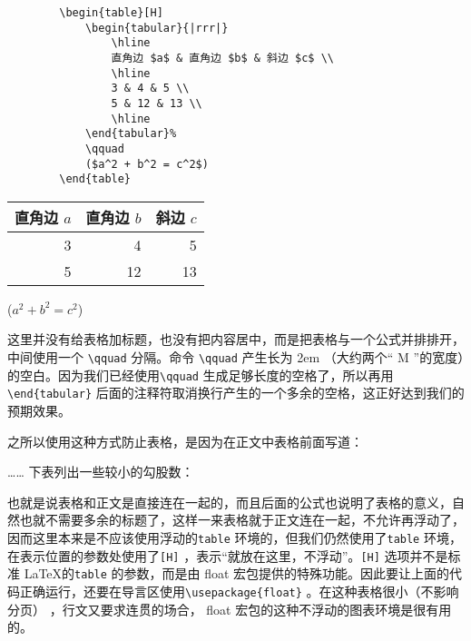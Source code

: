 \begin{minipage}[t]{0.45\textwidth}
    \begin{lstlisting}
        \begin{table}[H]
            \begin{tabular}{|rrr|}
                \hline
                直角边 $a$ & 直角边 $b$ & 斜边 $c$ \\ 
                \hline
                3 & 4 & 5 \\ 
                5 & 12 & 13 \\ 
                \hline
            \end{tabular}%
            \qquad
            ($a^2 + b^2 = c^2$)
        \end{table}
    \end{lstlisting}
\end{minipage}
\hfill
\begin{minipage}[t]{0.45\textwidth}
    \vspace{0.1cm}
    \hspace{0.5cm}
    \begin{table}[H]
        \begin{tabular}{|rrr|}
            \hline
            直角边 $a$ & 直角边 $b$ & 斜边 $c$ \\ 
            \hline
            3 & 4 & 5 \\ 
            5 & 12 & 13 \\ 
            \hline
        \end{tabular}%
        \qquad
        ($a^2 + b^2 = c^2$)
    \end{table}
\end{minipage}

这里并没有给表格加标题，也没有把内容居中，而是把表格与一个公式并排排开，中间使用一个 \verb|\qquad| 分隔。命令 \verb|\qquad| 产生长为 2em （大约两个“ M ”的宽度）的空白。因为我们已经使用\verb|\qquad| 生成足够长度的空格了，所以再用\verb|\end{tabular}| 后面的注释符取消换行产生的一个多余的空格，这正好达到我们的预期效果。

之所以使用这种方式防止表格，是因为在正文中表格前面写道：

{\qquad \heiti {} …… 下表列出一些较小的勾股数：}

也就是说表格和正文是直接连在一起的，而且后面的公式也说明了表格的意义，自然也就不需要多余的标题了，这样一来表格就于正文连在一起，不允许再浮动了，因而这里本来是不应该使用浮动的\verb|table| 环境的，但我们仍然使用了\verb|table| 环境，在表示位置的参数处使用了\verb|[H]| ，表示“就放在这里，不浮动”。\verb|[H]| 选项并不是标准 \LaTeX 的\verb|table| 的参数，而是由 float 宏包提供的特殊功能。因此要让上面的代码正确运行，还要在导言区使用\verb|\usepackage{float}| 。在这种表格很小（不影响分页） ，行文又要求连贯的场合， float 宏包的这种不浮动的图表环境是很有用的。

